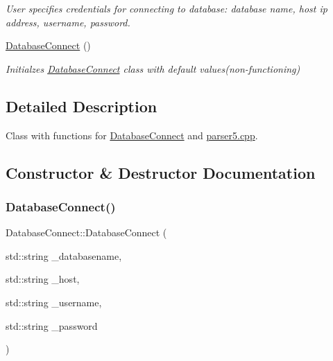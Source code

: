 \begin{DoxyCompactItemize}
\begin{DoxyCompactList}\small\item\em User specifies credentials for connecting to database\+: database name, host ip address, username, password. \end{DoxyCompactList}\item 
\mbox{\hyperlink{classDatabaseConnect_a5f6ea02e82b1b8463d8c8053ef811e1f}{Database\+Connect}} ()
\begin{DoxyCompactList}\small\item\em Initialzes \mbox{\hyperlink{classDatabaseConnect}{Database\+Connect}} class with default values(non-\/functioning) \end{DoxyCompactList}\end{DoxyCompactItemize}


\subsection{Detailed Description}
Class with functions for \mbox{\hyperlink{classDatabaseConnect}{Database\+Connect}} and \mbox{\hyperlink{parser5_8cpp}{parser5.\+cpp}}. 

\subsection{Constructor \& Destructor Documentation}
\mbox{\label{classDatabaseConnect_ad4273735005641691826765240a1dfb8}} 
\subsubsection{\texorpdfstring{Database\+Connect()}{DatabaseConnect()}\hspace{0.1cm}{\footnotesize\ttfamily [1/2]}}
{\footnotesize\ttfamily Database\+Connect\+::\+Database\+Connect (\begin{DoxyParamCaption}\item[{std\+::string}]{\+\_\+databasename,  }\item[{std\+::string}]{\+\_\+host,  }\item[{std\+::string}]{\+\_\+username,  }\item[{std\+::string}]{\+\_\+password }\end{DoxyParamCaption})}



